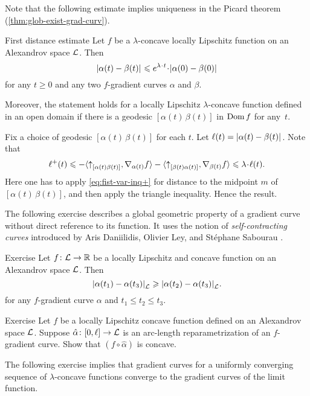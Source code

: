 Note that the following estimate implies uniqueness in the Picard theorem (\ref{thm:glob-exist-grad-curv}).

\begin{thm}{First distance estimate}\label{thm:dist-est}
Let $f$ be a $\lambda$-concave locally Lipschitz function on an Alexandrov space $\mathcal{L}$.
Then
\[\dist{\alpha(t)}{\beta(t)}{}
\le 
e^{\lambda\cdot t}\cdot\dist[{{}}]{\alpha(0)}{\beta(0)}{}\]
for any $t\ge 0$ and any two $f$-gradient curves $\alpha$ and $\beta$.

Moreover, the statement holds for a locally Lipschitz $\lambda$-concave function defined in an open domain if there is a geodesic $[\alpha(t)\,\beta(t)]$ in $\mathop{\rm Dom}\nolimits f$ for any~$t$.
\end{thm}

Fix a choice of geodesic $[\alpha(t)\,\beta(t)]$ for each $t$.
Let $\ell(t)=\dist{\alpha(t)}{\beta(t)}{}$. 
Note that
\[\ell^+(t)
\le-
\<\dir{\alpha(t)}{\beta(t)},\nabla_{\alpha(t)}f\>-\<\dir{\beta(t)}{\alpha(t)},\nabla_{\beta(t)}f\>
\le
\lambda\cdot\ell(t).\]
Here one has to apply \ref{eq:fist-var-inq+} for distance to the midpoint $m$ of $[\alpha(t)\,\beta(t)]$, and then apply the triangle inequality.
Hence the result. 
\qeds



The following exercise describes a global geometric property of a gradient curve without direct reference to its function.
It uses the notion of \textit{self-contracting curves} introduced by Aris Daniilidis, Olivier Ley, and St\'ephane Sabourau \cite{daniilidis-ley-sabourau}.

\begin{thm}{Exercise}\label{ex:elf-contracting}
Let $f\colon\mathcal{L}\to\mathbb{R}$ be a locally Lipschitz and concave function on an Alexandrov space
$\mathcal{L}$.
Then 
\[\dist{\alpha(t_1)}{\alpha(t_3)}{\spc{L}}\ge \dist{\alpha(t_2)}{\alpha(t_3)}{\spc{L}}.\]
for any $f$-gradient curve $\alpha$ and $t_1\le t_2\le t_3$.
\end{thm}

\begin{thm}{Exercise}\label{ex:mayer}
Let $f$ be a locally Lipschitz concave function defined on an Alexandrov space $\mathcal{L}$.
Suppose $\hat\alpha\colon[0,\ell]\to\mathcal{L}$ is an arc-length reparametrization of an $f$-gradient curve.
Show that $(f\circ\hat\alpha)$ is concave.
\end{thm}




The following exercise implies that gradient curves for a uniformly converging sequence of $\lambda$-concave functions converge to the gradient curves of the limit function.

